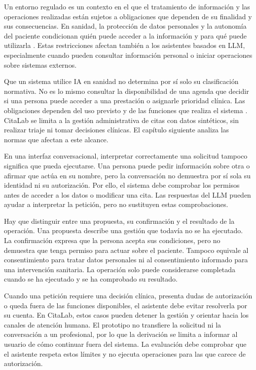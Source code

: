 Un entorno regulado es un contexto en el que el tratamiento de información y las operaciones realizadas están sujetos a obligaciones que dependen de su finalidad y sus consecuencias. En sanidad, la protección de datos personales y la autonomía del paciente condicionan quién puede acceder a la información y para qué puede utilizarla \citep{es2002autonomia,eu2016gdpr}. Estas restricciones afectan también a los asistentes basados en LLM, especialmente cuando pueden consultar información personal o iniciar operaciones sobre sistemas externos.

Que un sistema utilice IA en sanidad no determina por sí solo su clasificación normativa. No es lo mismo consultar la disponibilidad de una agenda que decidir si una persona puede acceder a una prestación o asignarle prioridad clínica. Las obligaciones dependen del uso previsto y de las funciones que realiza el sistema \citep{eu2024aiact}. CitaLab se limita a la gestión administrativa de citas con datos sintéticos, sin realizar triaje ni tomar decisiones clínicas. El capítulo siguiente analiza las normas que afectan a este alcance.

En una interfaz conversacional, interpretar correctamente una solicitud tampoco significa que pueda ejecutarse. Una persona puede pedir información sobre otra o afirmar que actúa en su nombre, pero la conversación no demuestra por sí sola su identidad ni su autorización. Por ello, el sistema debe comprobar los permisos antes de acceder a los datos o modificar una cita. Las respuestas del LLM pueden ayudar a interpretar la petición, pero no sustituyen estas comprobaciones.

Hay que distinguir entre una propuesta, su confirmación y el resultado de la operación. Una propuesta describe una gestión que todavía no se ha ejecutado. La confirmación expresa que la persona acepta sus condiciones, pero no demuestra que tenga permiso para actuar sobre el paciente. Tampoco equivale al consentimiento para tratar datos personales ni al consentimiento informado para una intervención sanitaria. La operación solo puede considerarse completada cuando se ha ejecutado y se ha comprobado su resultado.

Cuando una petición requiere una decisión clínica, presenta dudas de autorización o queda fuera de las funciones disponibles, el asistente debe evitar resolverla por su cuenta. En CitaLab, estos casos pueden detener la gestión y orientar hacia los canales de atención humana. El prototipo no transfiere la solicitud ni la conversación a un profesional, por lo que la derivación se limita a informar al usuario de cómo continuar fuera del sistema. La evaluación debe comprobar que el asistente respeta estos límites y no ejecuta operaciones para las que carece de autorización.

